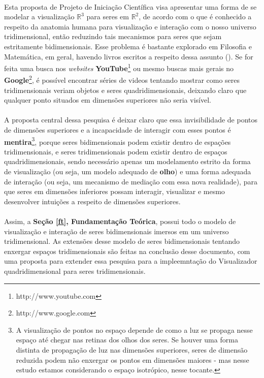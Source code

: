 \documentclass{article}
\newcommand\R{\mathbb{R}}
\begin{document}
	\paragraph{}
	Esta proposta de Projeto de Iniciação Científica visa apresentar uma forma de se modelar a visualização $\R^3$ para seres em $\R^2$, de acordo com o que é conhecido a respeito da anatomia humana para visualização e interação com o nosso universo tridimensional, então reduzindo tais mecanismos para seres que sejam estritamente bidimensionais. Esse problema é bastante explorado em Filosofia e Matemática, em geral, havendo livros escritos a respeito dessa assunto (\citep[p.~56]{1992Abbott}). Se for feita uma busca nos \textit{websites} \textbf{YouTube}\footnote{http://www.youtube.com} ou mesmo buscas mais gerais no \textbf{Google}\footnote{http://www.google.com}, é possível encontrar séries de videos tentando mostrar como seres tridimensionais veriam objetos e seres quadridimensionais, deixando claro que qualquer ponto situados em dimensões superiores não seria visível.
	
	\paragraph{}
	A proposta central dessa pesquisa é deixar claro que essa invisibilidade de pontos de dimensões superiores e a incapacidade de interagir com esses pontos é \textbf{mentira}\footnote{A visualização de pontos no espaço depende de como a luz se propaga nesse espaço até chegar nas retinas dos olhos dos seres. Se houver uma forma distinta de propagação de luz nas dimensões superiores, seres de dimensão reduzida podem não enxergar os pontos em dimensões maiores - mas nesse estudo estamos considerando o espaço isotrópico, nesse tocante.}, porque seres bidimensionais podem existir dentro de espações tridimensionais, e seres tridimensionais podem existir dentro de espaços quadridimensionais, sendo necessário apenas um modelamento estrito da forma de visualização (ou seja, um modelo adequado de \textbf{olho}) e uma forma adequada de interação (ou seja, um mecanismo de mediação com essa nova realidade), para que seres em dimensões inferiores possam interagir, visualizar e mesmo desenvolver intuições a respeito de dimensões superiores.
	
	\paragraph{}
	Assim, a \textbf{Seção \ref{ft}, Fundamentação Teórica}, possui todo o modelo de visualização e interação de seres bidimensionais imersos em um universo tridimensional. As extensões desse modelo de seres bidimensionais tentando enxergar espaços tridimensionais são feitas na conclusão desse documento, com uma proposta para extender essa pesquisa para a impleemntação do Visualizador quadridimensional para seres tridimensionais. 
	
\end{document}
